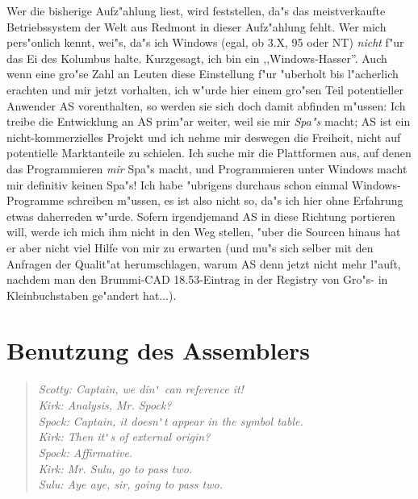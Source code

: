 \documentclass[12pt,a4paper,twoside]{report}
\begin{document}
Wer die bisherige  Aufz"ahlung liest, wird
feststellen, da"s das meistverkaufte Betriebssystem der Welt aus Redmont
in dieser Aufz"ahlung fehlt.  Wer mich pers"onlich kennt, wei"s, da"s ich
Windows (egal, ob 3.X, 95 oder NT) {\em nicht} f"ur das Ei des Kolumbus
halte.  Kurzgesagt, ich bin ein ,,Windows-Hasser''.  Auch wenn eine gro"se
Zahl an Leuten diese Einstellung f"ur "uberholt bis l"acherlich erachten
und mir jetzt vorhalten, ich w"urde hier einem gro"sen Teil potentieller
Anwender AS vorenthalten, so werden sie sich doch damit abfinden m"ussen:
Ich treibe die Entwicklung an AS prim"ar weiter, weil sie mir {\em Spa"s}
macht; AS ist ein nicht-kommerzielles Projekt und ich nehme mir deswegen
die Freiheit, nicht auf potentielle Marktanteile zu schielen.  Ich suche
mir die Plattformen aus, auf denen das Programmieren {\em mir} Spa"s
macht, und Programmieren unter Windows macht mir definitiv keinen Spa"s! 
Ich habe "ubrigens durchaus schon einmal Windows-Programme schreiben
m"ussen, es ist also nicht so, da"s ich hier ohne Erfahrung etwas
daherreden w"urde.  Sofern irgendjemand AS in diese Richtung portieren
will, werde ich mich ihm nicht in den Weg stellen, "uber die Sourcen
hinaus hat er aber nicht viel Hilfe von mir zu erwarten (und mu"s sich
selber mit den Anfragen der Qualit"at herumschlagen, warum AS denn jetzt
nicht mehr l"auft, nachdem man den Brummi-CAD 18.53-Eintrag in der
Registry von Gro"s- in Kleinbuchstaben ge"andert hat...).


\cleardoublepage
\chapter{Benutzung des Assemblers}

\begin{quote}\begin{raggedright}{\it
Scotty: Captain, we din\verb!'! can reference it! \\
Kirk:   Analysis, Mr. Spock? \\
Spock:  Captain, it doesn\verb!'!t appear in the symbol table. \\
Kirk:   Then it\verb!'!s of external origin? \\
Spock:  Affirmative. \\
Kirk:   Mr. Sulu, go to pass two. \\
Sulu:   Aye aye, sir, going to pass two. \\
}\end{raggedright}\end{quote}
\end{document}
